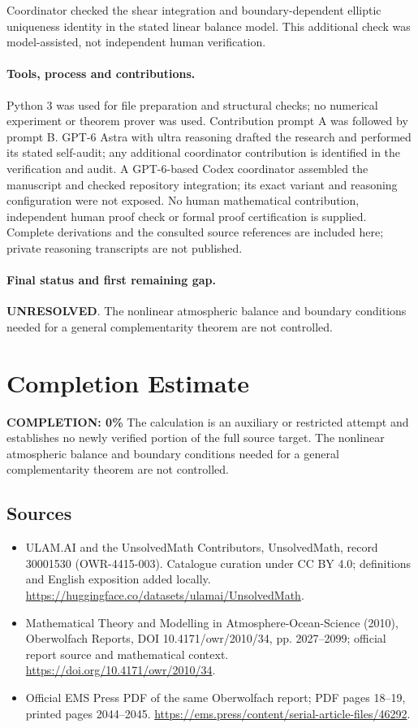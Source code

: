 \documentclass[11pt]{article}
\begin{document}
Coordinator checked the shear integration and boundary-dependent elliptic uniqueness identity in the stated linear balance model. This additional check was model-assisted, not independent human verification.

\paragraph{Tools, process and contributions.}
Python 3 was used for file preparation and structural checks; no numerical experiment or theorem prover was used. Contribution prompt A was followed by prompt B. GPT-6 Astra with ultra reasoning drafted the research and performed its stated self-audit; any additional coordinator contribution is identified in the verification and audit. A GPT-6-based Codex coordinator assembled the manuscript and checked repository integration; its exact variant and reasoning configuration were not exposed. No human mathematical contribution, independent human proof check or formal proof certification is supplied. Complete derivations and the consulted source references are included here; private reasoning transcripts are not published.

\paragraph{Final status and first remaining gap.}
\textbf{UNRESOLVED}. The nonlinear atmospheric balance and boundary conditions needed for a general complementarity theorem are not controlled.

\section{Completion Estimate}
\noindent\textbf{COMPLETION: 0\%}
The calculation is an auxiliary or restricted attempt and establishes no newly verified portion of the full source target. The nonlinear atmospheric balance and boundary conditions needed for a general complementarity theorem are not controlled.

\subsection{Sources}
\begin{itemize}
\item[\hypertarget{source:30001530:1}{S1}] ULAM.AI and the UnsolvedMath Contributors, UnsolvedMath, record 30001530 (OWR-4415-003). Catalogue curation under CC BY 4.0; definitions and English exposition added locally.
\url{https://huggingface.co/datasets/ulamai/UnsolvedMath}.
\item[\hypertarget{source:30001530:2}{S2}] Mathematical Theory and Modelling in Atmosphere-Ocean-Science (2010), Oberwolfach Reports, DOI 10.4171/owr/2010/34, pp. 2027--2099; official report source and mathematical context.
\url{https://doi.org/10.4171/owr/2010/34}.
\item[\hypertarget{source:30001530:3}{S3}] Official EMS Press PDF of the same Oberwolfach report; PDF pages 18--19, printed pages 2044--2045.
\url{https://ems.press/content/serial-article-files/46292}.
\end{itemize}
\label{end:30001530}
\end{document}
